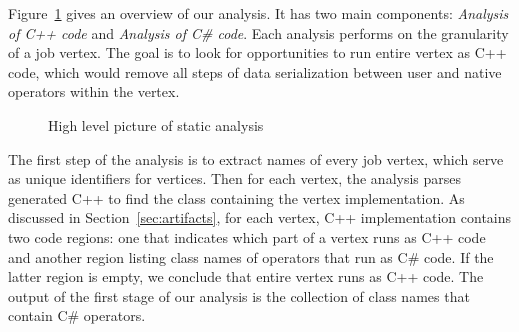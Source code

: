 Figure~\ref{fig:analysis} gives an overview of our analysis. It has two main components: \emph{Analysis of C++ code} and \emph{Analysis of C\# code}. Each analysis performs on the granularity of a job vertex. The goal is to look for opportunities to run entire vertex as C++ code, which would remove all steps of data serialization between user and native operators within the vertex.


\begin{figure}[ht]


\caption{High level picture of static analysis}
\label{fig:analysis}
\end{figure}

The first step of the analysis is to extract names of every job vertex, which serve as unique identifiers for vertices. Then for each vertex, the analysis parses generated C++ to find the class containing the vertex implementation. As discussed in Section~\ref{sec:artifacts}, for each vertex, C++ implementation contains two code regions: one that indicates which part of a vertex runs as C++ code and another region listing class names of operators that run as C\# code. If the latter region is empty, we conclude that entire vertex runs as C++ code. The output of the first stage of our analysis is the collection of class names that contain C\# operators.

